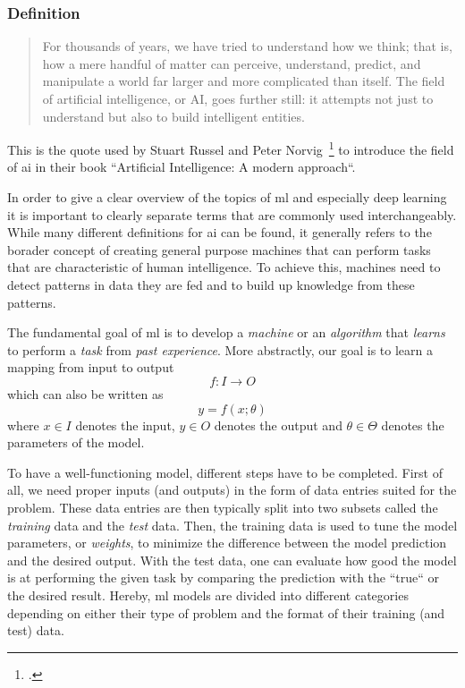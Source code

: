 \subsubsection{Definition}
\label{sub:definition}

\begin{quote}
For thousands of years, we have tried to understand how we think; that is, how a mere handful of matter can perceive, understand, predict, and manipulate a world far larger and more complicated than itself. The field of artificial intelligence, or AI, goes further still: it attempts not just to understand but also to build intelligent entities.
\end{quote}

This is the quote used by Stuart Russel and Peter Norvig~\footcite{russell2016artificial} to introduce the field of \gls{ai} in their book “Artificial Intelligence: A modern approach“.

In order to give a clear overview of the topics of \gls{ml} and especially deep learning it is important to clearly separate terms that are commonly used interchangeably. While many different definitions for \gls{ai} can be found, it generally refers to the borader concept of creating general purpose machines that can perform tasks that are characteristic of human intelligence. To achieve this, machines need to detect patterns in data they are fed and to build up knowledge from these patterns.

The fundamental goal of \gls{ml} is to develop a \textit{machine} or an \textit{algorithm} that \textit{learns} to perform a \textit{task} from \textit{past experience}. More abstractly, our goal is to learn a mapping from input to output
\begin{equation}
	f : I \rightarrow O
\end{equation}
which can also be written as
\begin{equation}
	y = f(x ; \theta)
\end{equation}
where $ x \in I $ denotes the input, $ y \in O $ denotes the output and $ \theta \in \Theta $ denotes the parameters of the model.

To have a well-functioning model, different steps have to be completed. First of all, we need proper inputs (and outputs) in the form of data entries suited for the problem. These data entries are then typically split into two subsets called the \textit{training} data and the \textit{test} data. Then, the training data is used to tune the model parameters, or \textit{weights}, to minimize the difference between the model prediction and the desired output. With the test data, one can evaluate how good the model is at performing the given task by comparing the prediction with the “true“ or the desired result. Hereby, \gls{ml} models are divided into different categories depending on either their type of problem and the format of their training (and test) data.

